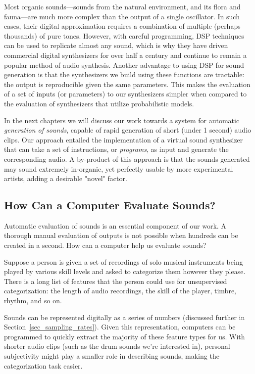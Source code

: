 \documentclass[\main/thesis.tex]{subfiles}
\begin{document}
 Most organic sounds---sounds from the natural environment, and its flora and fauna---are much more complex than the output of a single oscillator. In such cases, their digital approximation requires a combination of multiple (perhaps thousands) of pure tones. However, with careful programming, DSP techniques can be used to replicate almost any sound, which is why they have driven commercial digital synthesizers for over half a century \cite{jenkins2019analog} and continue to remain a popular method of audio synthesis. Another advantage to using DSP for sound generation is that the synthesizers we build using these functions are tractable: the output is reproducible given the same parameters. This makes the evaluation of a set of inputs (or parameters) to our synthesizers simpler when compared to the evaluation of synthesizers that utilize probabilistic models.
 
In the next chapters we will discuss our work towards a system for automatic \textit{generation of sounds}, capable of rapid generation of short (under 1 second) audio clips. Our approach entailed the implementation of a virtual sound synthesizer that can take a set of instructions, or \textit{programs}, as input and generate the corresponding audio. A by-product of this approach is that the sounds generated may sound extremely in-organic, yet perfectly usable by more experimental artists, adding a desirable "novel" factor. 



\subsection{How Can a Computer Evaluate Sounds?}
Automatic evaluation of sounds is an essential component of our work. A thorough manual evaluation of outputs is not possible when hundreds can be created in a second. How can a computer help us evaluate sounds?

Suppose a person is given a set of recordings of solo musical instruments being played by various skill levels and asked to categorize them however they please. There is a long list of features that the person could use for unsupervised categorization: the length of audio recordings, the skill of the player, timbre, rhythm, and so on. 

Sounds can be represented digitally as a series of numbers (discussed further in Section~\ref{sec_sampling_rates}). Given this representation, computers can be programmed to quickly extract the majority of these feature types for us. With shorter audio clips (such as the drum sounds we're interested in), personal subjectivity might play a smaller role in describing sounds, making the categorization task easier.
\end{document}
